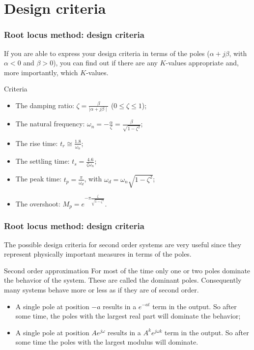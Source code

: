 \section{Design criteria}

\begin{frame}
\frametitle{Root locus method: design criteria}
	If you are able to express your design criteria in terms of the poles ($\alpha + j\beta$, with $\alpha < 0$ and $\beta>0$), you can find out if there are any $K$-values appropriate and, more importantly, which $K$-values.\\
	\begin{block}{Criteria}
	\begin{itemize}
		\item The damping ratio: $\zeta = \frac{\beta}{\mid \alpha + j\beta\mid}$ ($0 \leq \zeta \leq 1$);
		\item The natural frequency: $\omega_n = -\frac{\alpha}{\zeta} = \frac{\beta}{\sqrt{1 - \zeta^2}}$;
		\item The rise time: $t_r \cong \frac{1.8}{\omega_n}$;
		\item The settling time: $t_s = \frac{4.6}{\zeta \omega_n}$;
		\item The peak time: $t_p =\frac{\pi}{\omega_d}$, with $\omega_d = \omega_n \sqrt{1 - \zeta^2} $;
		\item The overshoot: $M_p = e^{-\pi \frac{\zeta}{\sqrt{1 - \zeta^2}}}$.
	\end{itemize}
	\end{block}
\end{frame}

\begin{frame}
\frametitle{Root locus method: design criteria}
	The possible design criteria for second order systems are very useful since they represent physically important measures in terms of the poles.\\
	\begin{alertblock}{Second order approximation}
		For most of the time only one or two poles dominate the behavior of the system. These are called the dominant poles. Consequently many systems behave more or less as if they are of second order. 
	\end{alertblock}
	\begin{itemize}
		\item A single pole at position $-a$ results in a $e^{-at}$ term in the output. So after some time, the poles with the largest real part will dominate the behavior;
		\item A single pole at position $Ae^{j\omega}$ results in a $A^ke^{j\omega k}$ term in the output. So after some time the poles with the largest modulus will dominate. 
	\end{itemize}
\end{frame}
	
